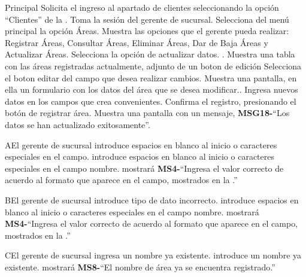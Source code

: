 	\begin{UCtrayectoria}{Principal}
		\UCpaso[\UCactor] Solicita el ingreso al apartado de clientes seleccionando la opción ``Clientes'' de la .
		\UCpaso Toma la sesión del gerente de sucursal.
		\UCpaso[\UCactor] Selecciona del menú principal la opción Áreas.
		\UCpaso Muestra las opciones que el gerente pueda realizar: Registrar Áreas, Consultar Áreas, Eliminar Áreas, Dar de Baja Áreas y Actualizar Áreas.
		\UCpaso[\UCactor] Selecciona la opción de actualizar datos. .
		\UCpaso Muestra una tabla con las áreas registradas actualmente, adjunto de un boton de edición
		\UCpaso[\UCactor] Selecciona el boton editar del campo que desea realizar cambios.
		\UCpaso Muestra una pantalla, en ella un formulario con los datos del área que se desea modificar..
		\UCpaso[\UCactor] Ingresa nuevos datos en los campos que crea convenientes.  
		\UCpaso[\UCactor] Confirma el registro, presionando el botón de registrar área.
		\UCpaso Muestra una pantalla con un mensaje, {\bf MSG18-}``Los datos se han actualizado exitosamente''.
	\end{UCtrayectoria}

		\begin{UCtrayectoriaA}{A}{El gerente de sucursal introduce espacios en blanco al inicio o caracteres especiales en el campo.}
			\UCpaso[\UCactor] introduce espacios en blanco al inicio o caracteres especiales en el campo nombre.
			\UCpaso mostrará {\bf MS4-}``Ingresa el valor correcto de acuerdo al formato que aparece en el campo, mostrados en la .''
		\end{UCtrayectoriaA}

		\begin{UCtrayectoriaA}{B}{El gerente de sucursal introduce tipo de dato incorrecto.}
			\UCpaso[\UCactor] introduce espacios en blanco al inicio o caracteres especiales en el campo nombre.
			\UCpaso mostrará {\bf MS4-}``Ingresa el valor correcto de acuerdo al formato que aparece en el campo, mostrados en la .''
		\end{UCtrayectoriaA}

		\begin{UCtrayectoriaA}{C}{El gerente de sucursal ingresa un nombre ya existente.}
			\UCpaso[\UCactor] introduce un nombre ya existente.
			\UCpaso mostrará {\bf MS8-}``El nombre de área ya se encuentra registrado.''
		\end{UCtrayectoriaA}